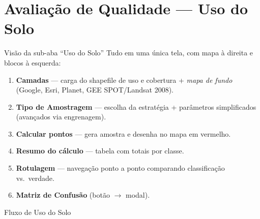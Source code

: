 \documentclass[10pt,aspectratio=169]{beamer}
\begin{document}
\section{Avaliação de Qualidade — Uso do Solo}
\begin{frame}{Visão da sub-aba ``Uso do Solo''}
  Tudo em uma única tela, com mapa à direita e blocos à esquerda:
  \begin{enumerate}
    \item \textbf{Camadas} — carga do shapefile de uso e cobertura + \emph{mapa de fundo} (Google, Esri, Planet, GEE SPOT/Landsat 2008).
    \item \textbf{Tipo de Amostragem} — escolha da estratégia + parâmetros simplificados (avançados via engrenagem).
    \item \textbf{Calcular pontos} — gera amostra e desenha no mapa em vermelho.
    \item \textbf{Resumo do cálculo} — tabela com totais por classe.
    \item \textbf{Rotulagem} — navegação ponto a ponto comparando classificação vs.\ verdade.
    \item \textbf{Matriz de Confusão} (botão $\rightarrow$ modal).
  \end{enumerate}
\end{frame}

\begin{frame}{Fluxo de Uso do Solo}
  \begin{center}
  \end{center}
\end{frame}
\end{document}
